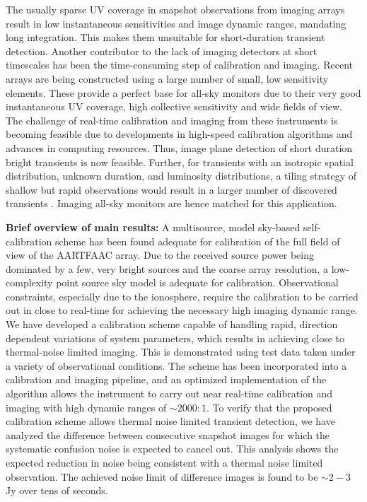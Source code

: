 \documentclass[referee]{aa}
\begin{document}
The  usually sparse  UV coverage  in snapshot  observations from  imaging arrays
result in  low instantaneous sensitivities  and image dynamic  ranges, mandating
long  integration.   This makes  them  unsuitable  for short-duration  transient
detection.   Another contributor  to  the  lack of  imaging  detectors at  short
timescales has been  the time-consuming step of calibration  and imaging. Recent
arrays  are being constructed  using a  large number  of small,  low sensitivity
elements. These  provide a perfect base  for all-sky monitors due  to their very
good instantaneous UV  coverage, high collective sensitivity and  wide fields of
view.  The challenge of real-time calibration and imaging from these instruments
is becoming  feasible due to  developments in high-speed  calibration algorithms
and  advances in  computing resources.   Thus,  image plane  detection of  short
duration  bright transients  is now  feasible. Further,  for transients  with an
isotropic spatial distribution,  unknown duration, and luminosity distributions,
a tiling  strategy of shallow  but rapid observations  would result in  a larger
number  of  discovered transients  \citep  {nemiroff2003tile}.  Imaging  all-sky
monitors are hence matched for this application.


\textbf{Brief  overview  of  main  results:}  A  multisource,  model  sky-based
self-calibration  scheme has  been found  adequate for  calibration of  the full
field of  view of the  AARTFAAC array.  Due  to the received source  power being
dominated by a few, very bright  sources and the coarse array resolution,
a  low-complexity   point  source  sky   model  is  adequate   for  calibration.
Observational  constraints,  especially  due   to  the  ionosphere,  require  the
calibration to be carried out in  close to real-time for achieving the necessary
high imaging dynamic  range.  We have developed a  calibration scheme capable of
handling  rapid,  direction dependent  variations  of  system parameters,  which
results  in  achieving   close  to  thermal-noise  limited   imaging.  This  is
demonstrated using test data taken  under a variety of observational conditions.
The scheme has been incorporated into a calibration and imaging pipeline, and an
optimized implementation  of the  algorithm allows the  instrument to  carry out
near real-time calibration and imaging  with high dynamic ranges of $\sim$$2000:1$.  To
verify  that  the  proposed  calibration  scheme allows  thermal  noise  limited
transient  detection,  we  have  analyzed  the  difference  between  consecutive
snapshot images for  which the systematic confusion noise  is expected to cancel
out. This analysis shows the expected reduction in noise being consistent with a
thermal noise limited observation. The achieved noise limit of difference images
is found to be $\sim$$2-3$ Jy over tens of seconds.
 
\end{document}
